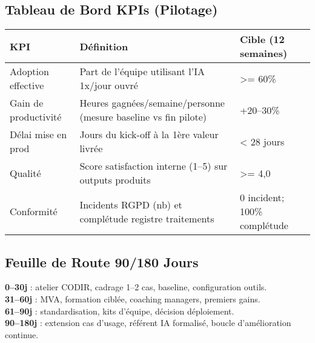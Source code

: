 \subsection{Tableau de Bord KPIs (Pilotage)}
\begin{longtable}{@{}p{5.4cm}p{5.4cm}p{5.4cm}@{}}
\toprule
\textbf{KPI} & \textbf{Définition} & \textbf{Cible (12 semaines)} \\
\midrule
Adoption effective & Part de l’équipe utilisant l’IA 1x/jour ouvré & \textgreater{}= 60\% \\
Gain de productivité & Heures gagnées/semaine/personne (mesure baseline vs fin pilote) & +20–30\% \\
Délai mise en prod & Jours du kick-off à la 1ère valeur livrée & \textless{} 28 jours \\
Qualité & Score satisfaction interne (1–5) sur outputs produits & \textgreater{}= 4{,}0 \\
Conformité & Incidents RGPD (nb) et complétude registre traitements & 0 incident; 100\% complétude \\
\bottomrule
\end{longtable}

\subsection{Feuille de Route 90/180 Jours}
\textbf{0–30j} : atelier CODIR, cadrage 1–2 cas, baseline, configuration outils.\\
\textbf{31–60j} : MVA, formation ciblée, coaching managers, premiers gains.\\
\textbf{61–90j} : standardisation, kits d’équipe, décision déploiement.\\
\textbf{90–180j} : extension cas d’usage, référent IA formalisé, boucle d’amélioration continue.



